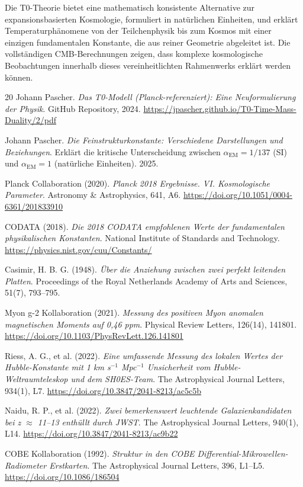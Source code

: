 	\begin{revolutionary}
		Die T0-Theorie bietet eine mathematisch konsistente Alternative zur expansionsbasierten Kosmologie, formuliert in natürlichen Einheiten, und erklärt Temperaturphänomene von der Teilchenphysik bis zum Kosmos mit einer einzigen fundamentalen Konstante, die aus reiner Geometrie abgeleitet ist. Die vollständigen CMB-Berechnungen zeigen, dass komplexe kosmologische Beobachtungen innerhalb dieses vereinheitlichten Rahmenwerks erklärt werden können.
	\end{revolutionary}
	

	
	\begin{thebibliography}{20}
		Johann Pascher.
		\textit{Das T0-Modell (Planck-referenziert): Eine Neuformulierung der Physik}.
		GitHub Repository, 2024.
		\url{https://jpascher.github.io/T0-Time-Mass-Duality/2/pdf}
		
		Johann Pascher.
		\textit{Die Feinstrukturkonstante: Verschiedene Darstellungen und Beziehungen}.
		Erklärt die kritische Unterscheidung zwischen $\alpha_{\text{EM}} = 1/137$ (SI) und $\alpha_{\text{EM}} = 1$ (natürliche Einheiten).
		2025.
		
		Planck Collaboration (2020). 
		\textit{Planck 2018 Ergebnisse. VI. Kosmologische Parameter}. 
		Astronomy \& Astrophysics, 641, A6. 
		\url{https://doi.org/10.1051/0004-6361/201833910}
		
		CODATA (2018). 
		\textit{Die 2018 CODATA empfohlenen Werte der fundamentalen physikalischen Konstanten}. 
		National Institute of Standards and Technology. 
		\url{https://physics.nist.gov/cuu/Constants/}
		
		Casimir, H. B. G. (1948). 
		\textit{Über die Anziehung zwischen zwei perfekt leitenden Platten}. 
		Proceedings of the Royal Netherlands Academy of Arts and Sciences, 51(7), 793--795.
		
		Myon g-2 Kollaboration (2021). 
		\textit{Messung des positiven Myon anomalen magnetischen Moments auf 0,46 ppm}. 
		Physical Review Letters, 126(14), 141801. 
		\url{https://doi.org/10.1103/PhysRevLett.126.141801}
		
		Riess, A. G., et al. (2022). 
		\textit{Eine umfassende Messung des lokalen Wertes der Hubble-Konstante mit 1 km s$^{-1}$ Mpc$^{-1}$ Unsicherheit vom Hubble-Weltraumteleskop und dem SH0ES-Team}. 
		The Astrophysical Journal Letters, 934(1), L7. 
		\url{https://doi.org/10.3847/2041-8213/ac5c5b}
		
		Naidu, R. P., et al. (2022). 
		\textit{Zwei bemerkenswert leuchtende Galaxienkandidaten bei z $\approx$ 11--13 enthüllt durch JWST}. 
		The Astrophysical Journal Letters, 940(1), L14. 
		\url{https://doi.org/10.3847/2041-8213/ac9b22}
		
		COBE Kollaboration (1992). 
		\textit{Struktur in den COBE Differential-Mikrowellen-Radiometer Erstkarten}. 
		The Astrophysical Journal Letters, 396, L1--L5. 
		\url{https://doi.org/10.1086/186504}
	\end{thebibliography}
